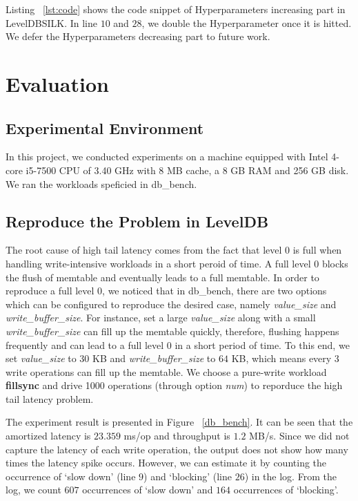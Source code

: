 \documentclass[letter,twocolumn,10pt]{article}
\begin{document}

Listing ~\ref{lst:code} shows the code snippet of Hyperparameters increasing part in LevelDBSILK. In line $10$ and $28$, we double the Hyperparameter once it is hitted. We defer the Hyperparameters decreasing part to future work.
\section{Evaluation}
\label{sec:evaluation}
\subsection {Experimental Environment}
In this project, we conducted experiments on a machine equipped with Intel 4-core
i5-7500 CPU of 3.40 GHz with 8 MB cache, a 8 GB RAM and 256 GB disk. We ran the workloads speficied in \textsf{db\_bench}. 

\subsection {Reproduce the Problem in LevelDB}
\label{sec:reproduce}

The root cause of high tail latency comes from the fact that level 0 is full when handling write-intensive workloads in a short peroid of time. A full level 0 blocks the flush of memtable and eventually leads to a full memtable. In order to reproduce a full level $0$, we noticed that in \textsf{db\_bench}, there are two options which can be configured to reproduce the desired case, namely \textit{value\_size} and \textit{write\_buffer\_size}. For instance, set a large \textit{value\_size} along with a small \textit{write\_buffer\_size} can fill up the memtable quickly, therefore, flushing happens frequently and can lead to a full level $0$ in a short period of time. To this end, we set \textit{value\_size} to $30$ KB and \textit{write\_buffer\_size} to $64$ KB, which means every 3 write operations can fill up the memtable. We choose a pure-write workload \textbf{fillsync} and drive 1000 operations (through option \textit{num}) to reporduce the high tail latency problem.

The experiment result is presented in Figure ~\ref{db_bench}. It can be seen that the amortized latency is $23.359$ ms/op and throughput is $1.2$ MB/s. Since we did not capture the latency of each write operation, the output does not show how many times the latency spike occurs. However, we can estimate it by counting the occurrence of `slow down' (line $9$) and `blocking' (line $26$) in the log. From the log, we count $607$ occurrences of `slow down' and $164$ occurrences of `blocking'.  
\end{document}

